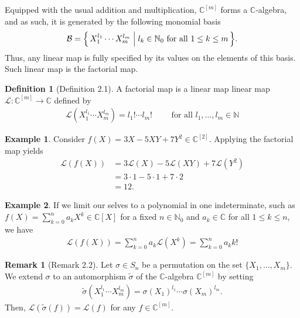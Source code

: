 \documentclass[a4paper]{article}
\theoremstyle{definition}
\newtheorem{definition}{Definition}[]
\newtheorem{example}{Example}[definition]
\newtheorem*{remark}{Remark}
\newcommand{\makeset}[2]{\mleft\{\, #1 \; \middle| \; #2 \,\mright\}}
\begin{document}
Equipped with the usual addition and multiplication, \(\mathbb{C}^{[m]}\) forms a \(\mathbb{C}\)-algebra, and as such, it is generated by the following monomial basis
%
\begin{align*}
    \mathcal{B} = \makeset{X_1^{l_1} \cdots X_m^{l_m}}{l_k \in \mathbb{N}_0 \text{ for all } 1 \leq k \leq m} \text{.}
\end{align*}
%
Thus, any linear map is fully specified by its values on the elements of this basis. Such linear map is the factorial map.
%
\begin{definition}[Definition 2.1]
    A factorial map is a linear map linear map \(\mathcal{L}: \mathbb{C}^{[m]} \longrightarrow \mathbb{C}\) defined by
    \begin{align*}
        \mathcal{L}(X_1^{l_1} \cdots X_m^{l_m}) = l_1! \cdots l_m! \qquad \text{ for all } l_1, \ldots, l_m \in \mathbb{N}
    \end{align*}
\end{definition}
%
\begin{example}
    Consider \(f(X) = 3X - 5XY + 7Y^2 \in \mathbb{C}^{[2]}\). Applying the factorial map yields
    \begin{align*}
        \mathcal{L}(f(X)) &= 3\mathcal{L}(X) - 5 \mathcal{L}(XY) + 7 \mathcal{L}(Y^2) \\
        &= 3 \cdot 1 - 5 \cdot 1 + 7 \cdot 2 \\
        &= 12 \text{.}
    \end{align*}
\end{example}
%
\begin{example}
    If we limit our selves to a polynomial in one indeterminate, such as \(f(X) = \sum_{k = 0}^n a_k X^k \in \mathbb{C}[X]\) for a fixed \(n \in \mathbb{N}_0\) and \(a_k \in \mathbb{C}\) for all \(1 \leq k \leq n\), we have
    \begin{align*}
        \mathcal{L}(f(X)) = \sum_{k = 0}^n a_k \mathcal{L}(X^k) = \sum_{k=0}^n a_k k!
    \end{align*}
\end{example}
%
\begin{remark}[Remark 2.2]
    Let \(\sigma \in S_n\) be a permutation on the set \(\{X_1, \ldots, X_m\}\). We extend \(\sigma\) to an automorphism \(\tilde{\sigma}\) of the \(\mathbb{C}\)-algebra \(\mathbb{C}^{[m]}\) by setting
    \begin{align*}
        \tilde{\sigma} \left( X_1^{l_1} \cdots X_m^{l_m} \right) = \sigma(X_1)^{l_1} \cdots \sigma(X_m)^{l_m} \text{.}
    \end{align*}
    Then, \(\mathcal{L}(\tilde{\sigma}(f)) = \mathcal{L}(f)\) for any \(f \in \mathbb{C}^{[m]}\).
\end{remark}
\end{document}
